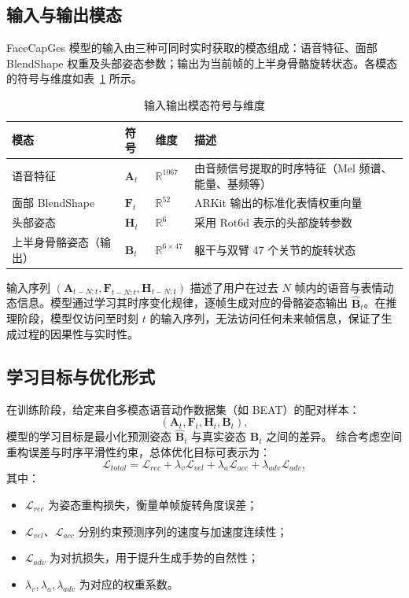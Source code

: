 \subsection{输入与输出模态}

FaceCapGes 模型的输入由三种可同时实时获取的模态组成：语音特征、面部 BlendShape 权重及头部姿态参数；输出为当前帧的上半身骨骼旋转状态。各模态的符号与维度如表~\ref{tab:modalities} 所示。

\begin{table}[h]
\centering
\caption{输入输出模态符号与维度}
\label{tab:modalities}
\begin{tabular}{llll}
\toprule
\textbf{模态} & \textbf{符号} & \textbf{维度} & \textbf{描述} \\
\midrule
语音特征 & $\mathbf{A}_t$ & $\mathbb{R}^{1067}$ & 由音频信号提取的时序特征（Mel 频谱、能量、基频等） \\
面部 BlendShape & $\mathbf{F}_t$ & $\mathbb{R}^{52}$ & ARKit 输出的标准化表情权重向量 \\
头部姿态 & $\mathbf{H}_t$ & $\mathbb{R}^{6}$ & 采用 Rot6d 表示的头部旋转参数 \\
上半身骨骼姿态（输出） & $\mathbf{B}_t$ & $\mathbb{R}^{6 \times 47}$ & 躯干与双臂 47 个关节的旋转状态 \\
\bottomrule
\end{tabular}
\end{table}

输入序列 $(\mathbf{A}_{t-N:t}, \mathbf{F}_{t-N:t}, \mathbf{H}_{t-N:t})$ 描述了用户在过去 $N$ 帧内的语音与表情动态信息。模型通过学习其时序变化规律，逐帧生成对应的骨骼姿态输出 $\hat{\mathbf{B}}_t$。在推理阶段，模型仅访问至时刻 $t$ 的输入序列，无法访问任何未来帧信息，保证了生成过程的因果性与实时性。

\subsection{学习目标与优化形式}

在训练阶段，给定来自多模态语音动作数据集（如 BEAT）的配对样本：
\begin{equation}
(\mathbf{A}_t, \mathbf{F}_t, \mathbf{H}_t, \mathbf{B}_t),
\end{equation}
模型的学习目标是最小化预测姿态 $\hat{\mathbf{B}}_t$ 与真实姿态 $\mathbf{B}_t$ 之间的差异。
综合考虑空间重构误差与时序平滑性约束，总体优化目标可表示为：
\begin{equation}
\mathcal{L}_{total} =
\mathcal{L}_{rec} + \lambda_v \mathcal{L}_{vel} + \lambda_a \mathcal{L}_{acc} + \lambda_{adv} \mathcal{L}_{adv},
\end{equation}
其中：
\begin{itemize}
    \item $\mathcal{L}_{rec}$ 为姿态重构损失，衡量单帧旋转角度误差；
    \item $\mathcal{L}_{vel}$、$\mathcal{L}_{acc}$ 分别约束预测序列的速度与加速度连续性；
    \item $\mathcal{L}_{adv}$ 为对抗损失，用于提升生成手势的自然性；
    \item $\lambda_v, \lambda_a, \lambda_{adv}$ 为对应的权重系数。
\end{itemize}

